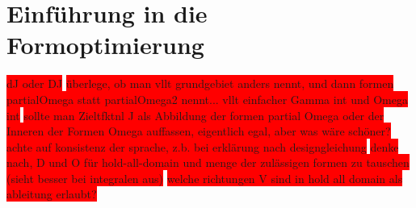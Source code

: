 


\section{Einführung in die Formoptimierung}

\colorbox{red}{dJ oder DJ}
\colorbox{red}{überlege, ob man vllt grundgebiet anders nennt, und dann formen partialOmega statt partialOmega2 nennt... vllt einfacher Gamma int und Omega int}
\colorbox{red}{ sollte man Zieltfktnl J als Abbildung der formen partial Omega oder der Inneren der Formen Omega auffassen, eigentlich egal, aber was wäre schöner? achte auf konsistenz der sprache, z.b. bei erklärung nach designgleichung}
\colorbox{red}{denke nach, D und O für hold-all-domain und menge der zulässigen formen zu tauschen (sieht besser bei integralen aus)}
\colorbox{red}{welche richtungen V sind in hold all domain als ableitung erlaubt?}

